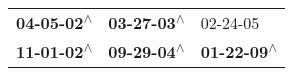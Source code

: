 \begin{supertabular}{lll}
 \textbf{04-05-02\textsuperscript{$\wedge$}} &  \textbf{03-27-03\textsuperscript{$\wedge$}} &                   02-24-05\textsuperscript{} \\
 \textbf{11-01-02\textsuperscript{$\wedge$}} &  \textbf{09-29-04\textsuperscript{$\wedge$}} &  \textbf{01-22-09\textsuperscript{$\wedge$}} \\
\end{supertabular}
